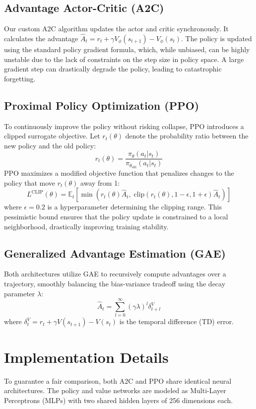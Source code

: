 \documentclass[12pt, a4paper]{article}
\begin{document}
\subsection{Advantage Actor-Critic (A2C)}
Our custom A2C algorithm updates the actor and critic synchronously. It calculates the advantage $\hat{A}_t = r_t + \gamma V_\phi(s_{t+1}) - V_\phi(s_t)$. The policy is updated using the standard policy gradient formula, which, while unbiased, can be highly unstable due to the lack of constraints on the step size in policy space. A large gradient step can drastically degrade the policy, leading to catastrophic forgetting.

\subsection{Proximal Policy Optimization (PPO)}
To continuously improve the policy without risking collapse, PPO introduces a clipped surrogate objective. Let $r_t(\theta)$ denote the probability ratio between the new policy and the old policy:
\begin{equation}
r_t(\theta) = \frac{\pi_\theta(a_t|s_t)}{\pi_{\theta_{\text{old}}}(a_t|s_t)}
\end{equation}
PPO maximizes a modified objective function that penalizes changes to the policy that move $r_t(\theta)$ away from 1:
\begin{equation}
L^{\text{CLIP}}(\theta) = \mathbb{E}_t \left[ \min\left( r_t(\theta)\hat{A}_t,\; \text{clip}(r_t(\theta), 1-\epsilon, 1+\epsilon)\hat{A}_t \right) \right]
\end{equation}
where $\epsilon = 0.2$ is a hyperparameter determining the clipping range. This pessimistic bound ensures that the policy update is constrained to a local neighborhood, drastically improving training stability.

\subsection{Generalized Advantage Estimation (GAE)}
Both architectures utilize GAE to recursively compute advantages over a trajectory, smoothly balancing the bias-variance tradeoff using the decay parameter $\lambda$:
\begin{equation}
\hat{A}_t = \sum_{l=0}^{\infty} (\gamma \lambda)^l \delta_{t+l}^{V}
\end{equation}
where $\delta_t^V = r_t + \gamma V(s_{t+1}) - V(s_t)$ is the temporal difference (TD) error.

\section{Implementation Details}
To guarantee a fair comparison, both A2C and PPO share identical neural architectures. The policy and value networks are modeled as Multi-Layer Perceptrons (MLPs) with two shared hidden layers of 256 dimensions each.
\end{document}
